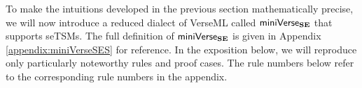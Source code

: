 
To make the intuitions developed in the previous section mathematically precise, we will now introduce a reduced dialect of VerseML called $\mathsf{miniVerse}_\textbf{SE}$ that supports seTSMs. 
The full definition of $\mathsf{miniVerse}_\textbf{SE}$ is given in Appendix \ref{appendix:miniVerseSES} for reference. In the exposition below, we will reproduce only particularly noteworthy rules and proof cases. The rule numbers below refer to the corresponding rule numbers in the appendix.

